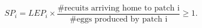 \documentclass[12pt, oneside]{article}   	%
\begin{document}
\begin{equation}
SP_i = LEP_{i} \times \frac{\# \text{recuits arriving home to patch i}}{\# \text{eggs produced by patch i}} \geq 1 \label{SP_simp_v1}. %
\end{equation}

	
	







\end{document}
